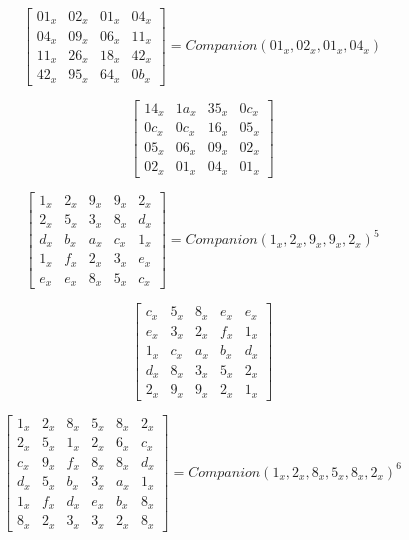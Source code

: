 \begin{equation}\label{mat:photon4x4}
    \begin{bmatrix}
    01_x & 02_x & 01_x & 04_x\\
    04_x & 09_x & 06_x & 11_x\\
    11_x & 26_x & 18_x & 42_x\\
    42_x & 95_x & 64_x & 0b_x
    \end{bmatrix}
    =
    Companion(01_x, 02_x, 01_x, 04_x)
\end{equation}

\begin{equation}\label{mat:photon4x4-inv}
    \begin{bmatrix}
    14_x & 1a_x & 35_x & 0c_x\\
    0c_x & 0c_x & 16_x & 05_x\\
    05_x & 06_x & 09_x & 02_x\\
    02_x & 01_x & 04_x & 01_x
    \end{bmatrix}
\end{equation}

\begin{equation}\label{mat:photon_a100}
  \begin{bmatrix}
  1_x & 2_x & 9_x & 9_x & 2_x\\
  2_x & 5_x & 3_x & 8_x & d_x\\
  d_x & b_x & a_x & c_x & 1_x\\
  1_x & f_x & 2_x & 3_x & e_x\\
  e_x & e_x & 8_x & 5_x & c_x
  \end{bmatrix}
  =
  Companion(1_x,2_x,9_x,9_x,2_x)^5
\end{equation}

\begin{equation}\label{mat:photon_a100-inv}
  \begin{bmatrix}
  c_x & 5_x & 8_x & e_x & e_x\\
  e_x & 3_x & 2_x & f_x & 1_x\\
  1_x & c_x & a_x & b_x & d_x\\
  d_x & 8_x & 3_x & 5_x & 2_x\\
  2_x & 9_x & 9_x & 2_x & 1_x
  \end{bmatrix}
\end{equation}

\begin{equation}\label{mat:photon_a144}
  \begin{bmatrix}
  1_x & 2_x & 8_x & 5_x & 8_x & 2_x\\
  2_x & 5_x & 1_x & 2_x & 6_x & c_x\\
  c_x & 9_x & f_x & 8_x & 8_x & d_x\\
  d_x & 5_x & b_x & 3_x & a_x & 1_x\\
  1_x & f_x & d_x & e_x & b_x & 8_x\\
  8_x & 2_x & 3_x & 3_x & 2_x & 8_x
  \end{bmatrix}
  =
  Companion(1_x,2_x,8_x,5_x,8_x,2_x)^6
\end{equation}

